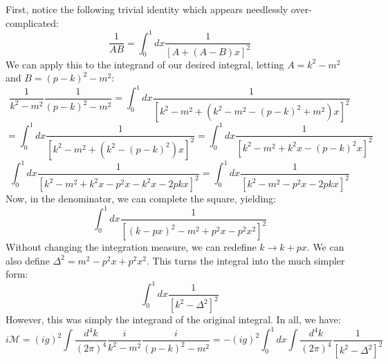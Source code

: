 \documentclass{report}
\begin{document}
First, notice the following trivial identity which appears needlessly over-complicated:
\[
\frac{1}{AB} = \int_0^1 dx \frac{1}{[A + (A - B)x]^2}
\]
We can apply this to the integrand of our desired integral, letting $A = k^2 - m^2$ and $B = (p - k)^2 - m^2$:
\[
\frac{1}{k^2 - m^2} \frac{1}{(p - k)^2 - m^2} = \int_0^1 dx \frac{1}{[k^2 - m^2 + (k^2 - m^2 - (p - k)^2 + m^2)x]^2}
\]
\[
= \int_0^1 dx \frac{1}{[k^2 - m^2 + (k^2 - (p - k)^2)x]^2} = \int_0^1 dx \frac{1}{[k^2 - m^2 + k^2x - (p - k)^2x]^2}
\]
\[
\int_0^1 dx \frac{1}{[k^2 - m^2 + k^2x - p^2x - k^2x - 2pkx]^2} = \int_0^1 dx \frac{1}{[k^2 - m^2 - p^2x - 2pkx]^2}
\]
Now, in the denominator, we can complete the square, yielding:
\[
\int_0^1 dx \frac{1}{[(k - px)^2 - m^2 + p^2x - p^2x^2]^2}
\]
Without changing the integration measure, we can redefine $k \rightarrow k + px$. We can also define $\Delta^2 = m^2 - p^2x + p^2x^2$. This turns the integral into the much simpler form:
\[
\int_0^1 dx \frac{1}{[k^2 - \Delta^2]^2}
\]
However, this was simply the integrand of the original integral. In all, we have:
\[
i \mathcal{M} = (ig)^2 \int \frac{d^4k}{(2\pi)^4} \frac{i}{k^2 - m^2} \frac{i}{(p - k)^2 - m^2} = -(ig)^2 \int_0^1 dx \int \frac{d^4k}{(2\pi)^4} \frac{1}{[k^2 - \Delta^2]^2}
\]
\end{document}
